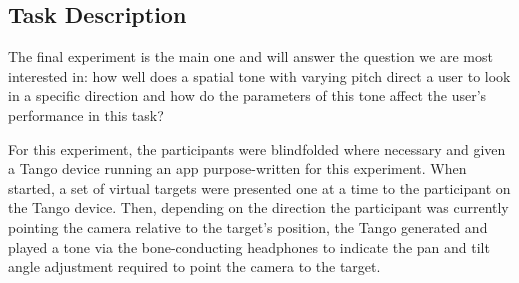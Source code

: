 \documentclass[sigconf, review=true, screen=true, anonymous=true]{acmart}
\begin{document}




\subsection{Task Description}

The final experiment is the main one and will answer the question we are most interested in: how well does a spatial tone with varying pitch direct a user to look in a specific direction and how do the parameters of this tone affect the user's performance in this task? 

For this experiment, the participants were blindfolded where necessary and given a Tango device running an app purpose-written for this experiment.
When started, a set of virtual targets were presented one at a time to the participant on the Tango device.
Then, depending on the direction the participant was currently pointing the camera relative to the target's position, the Tango generated and played a tone via the bone-conducting headphones to indicate the pan and tilt angle adjustment required to point the camera to the target. %
\end{document}
